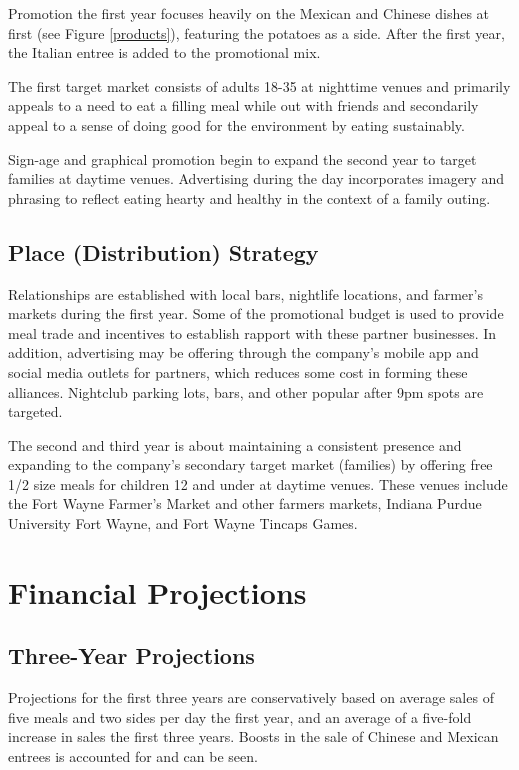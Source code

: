 \documentclass[12pt, letterpaper]{article}
\begin{document}
Promotion the first year focuses heavily on the Mexican and Chinese dishes at first (see Figure \ref{products}), featuring the potatoes as a side. After the first year, the Italian entree is added to the promotional mix.

The first target market consists of adults 18-35 at nighttime venues and primarily appeals to a need to eat a filling meal while out with friends and secondarily appeal to a sense of doing good for the environment by eating sustainably.

Sign-age and graphical promotion begin to expand the second year to target families at daytime venues.  Advertising during the day incorporates imagery and phrasing to reflect eating hearty and healthy in the context of a family outing.
\subsection{Place (Distribution) Strategy}
Relationships are established with local bars, nightlife locations, and farmer's markets during the first year.  Some of the promotional budget is used to provide meal trade and incentives to establish rapport with these partner businesses.  In addition, advertising may be offering through the company's mobile app and social media outlets for partners, which reduces some cost in forming these alliances.  Nightclub parking lots, bars, and other popular after 9pm spots are targeted.

The second and third year is about maintaining a consistent presence and expanding to the company's secondary target market (families) by offering free 1/2 size meals for children 12 and under at daytime venues.  These venues include the Fort Wayne Farmer's Market and other farmers markets, Indiana Purdue University Fort Wayne, and Fort Wayne Tincaps Games.

\newpage

\section{Financial Projections}
\subsection{Three-Year Projections}

Projections for the first three years are conservatively based on average sales of five meals and two sides per day the first year, and an average of a five-fold increase in sales the first three years.  Boosts in the sale of Chinese and Mexican entrees is accounted for and can be seen.
\end{document}
